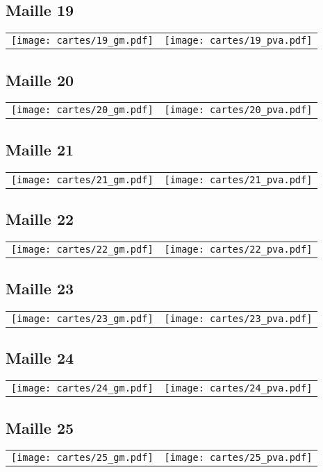 \subsection{Maille 19}
\begin{tabular}{ll}
\texttt{[image: cartes/19\_gm.pdf]}
&
\texttt{[image: cartes/19\_pva.pdf]}
\end{tabular}
\newpage
\subsection{Maille 20}
\begin{tabular}{ll}
\texttt{[image: cartes/20\_gm.pdf]}
&
\texttt{[image: cartes/20\_pva.pdf]}
\end{tabular}
\newpage
\subsection{Maille 21}
\begin{tabular}{ll}
\texttt{[image: cartes/21\_gm.pdf]}
&
\texttt{[image: cartes/21\_pva.pdf]}
\end{tabular}
\newpage
\subsection{Maille 22}
\begin{tabular}{ll}
\texttt{[image: cartes/22\_gm.pdf]}
&
\texttt{[image: cartes/22\_pva.pdf]}
\end{tabular}
\newpage
\subsection{Maille 23}
\begin{tabular}{ll}
\texttt{[image: cartes/23\_gm.pdf]}
&
\texttt{[image: cartes/23\_pva.pdf]}
\end{tabular}
\newpage
\subsection{Maille 24}
\begin{tabular}{ll}
\texttt{[image: cartes/24\_gm.pdf]}
&
\texttt{[image: cartes/24\_pva.pdf]}
\end{tabular}
\newpage
\subsection{Maille 25}
\begin{tabular}{ll}
\texttt{[image: cartes/25\_gm.pdf]}
&
\texttt{[image: cartes/25\_pva.pdf]}
\end{tabular}
\newpage
